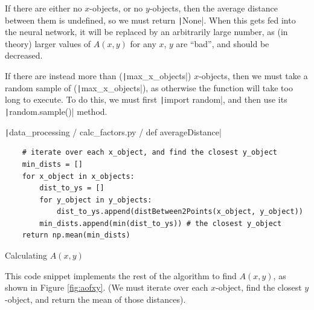 \documentclass[12pt]{report}
\newcommand{\pil}[1]{\protect\texttt|#1|}
\begin{document}
If there are either no $x$-objects, or no $y$-objects, then the average distance between them is undefined, so we must return \pil{None}. When this gets fed into the neural network, it will be replaced by an arbitrarily large number, as (in theory) larger values of $A\left(x,y\right)$ for any $x$, $y$ are ``bad'', and should be decreased.

If there are instead more than (\pil{max_x_objects}) $x$-objects, then we must take a random sample of (\pil{max_x_objects}), as otherwise the function will take too long to execute. To do this, we must first \pil{import random}, and then use its \pil{random.sample()} method.

\begin{center}
\end{center}

\begin{listing}[H]
\pil{data_processing / calc_factors.py / def averageDistance}
\begin{verbatim}
    # iterate over each x_object, and find the closest y_object
    min_dists = []
    for x_object in x_objects:
        dist_to_ys = []
        for y_object in y_objects:
            dist_to_ys.append(distBetween2Points(x_object, y_object))
        min_dists.append(min(dist_to_ys)) # the closest y_object
    return np.mean(min_dists)
\end{verbatim}
\caption{Calculating $A\left(x,y\right)$}\label{cs:aofxyCalc}
\end{listing}

This code snippet implements the rest of the algorithm to find $A\left(x,y\right)$, as shown in Figure \ref{fig:aofxy}. (We must iterate over each $x$-object, find the closest $y$-object, and return the mean of those distances).
\end{document}
